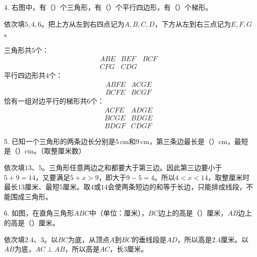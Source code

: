 4. 右图中，有（\hspace{1.8em}）个三角形，有（\hspace{1.8em}）个平行四边形，有（\hspace{1.8em}）个梯形。\par
{}
\begin{BookAnswer}
依次填\(5,4,6\)。把上方从左到右四点记为\(A,B,C,D\)，下方从左到右三点记为\(E,F,G\)。\par 三角形共\(5\)个：\[\begin{array}{ccc}ABE&BEF&BCF\\CFG&CDG&\end{array}\]平行四边形共\(4\)个：\[\begin{array}{cc}ABFE&ACGE\\BCFE&BCGF\end{array}\]恰有一组对边平行的梯形共\(6\)个：\[\begin{array}{cc}ACFE&ADGE\\BCGE&BDGE\\BDGF&CDGF\end{array}\]
\end{BookAnswer}

5. 已知一个三角形的两条边长分别是\(5\,\mathrm{cm}\)和\(9\,\mathrm{cm}\)，第三条边最长是（\hspace{1.8em}）\(\mathrm{cm}\)，最短是（\hspace{1.8em}）\(\mathrm{cm}\)。（取整厘米数）\par
\begin{BookAnswer}
依次填\(13\)、\(5\)。三角形任意两边之和都要大于第三边。因此第三边要小于\(5+9=14\)，又要满足\(5+x>9\)，即大于\(9-5=4\)。所以\(4<x<14\)，取整厘米时最长\(13\)厘米、最短\(5\)厘米。取\(4\)或\(14\)会使两条短边的和等于长边，只能排成线段，不能围成三角形。
\end{BookAnswer}

6. 如图，在直角三角形\(ABC\)中（单位：厘米），\allowbreak{}\(BC\)边上的高是（\hspace{1.8em}）厘米，\allowbreak{}\(AB\)边上的高是（\hspace{1.8em}）厘米。\par
{}
\begin{BookAnswer}
依次填\(2.4\)、\(3\)。以\(BC\)为底，从顶点\(A\)到\(BC\)的垂线段是\(AD\)，所以高是\(2.4\)厘米。以\(AB\)为底，\allowbreak{}\(AC\perp AB\)，所以高是\(AC\)，长\(3\)厘米。
\end{BookAnswer}

